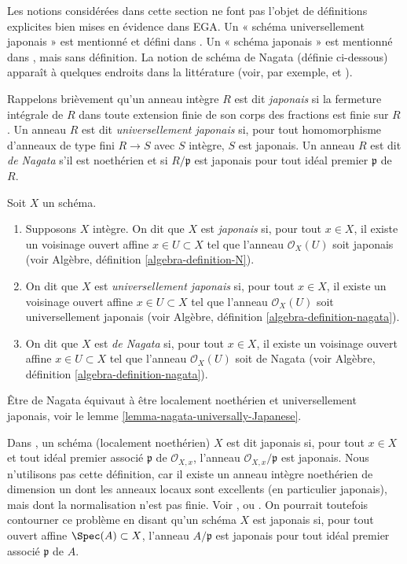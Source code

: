 \noindent
Les notions considérées dans cette section ne font pas l'objet de définitions explicites bien mises en évidence dans EGA.
Un « schéma universellement japonais » est mentionné et défini dans
\cite[IV Corollary 5.11.4]{EGA}. Un « schéma japonais » est mentionné dans
\cite[IV Remark 10.4.14 (ii)]{EGA}, mais sans définition.
La notion de schéma de Nagata (définie ci-dessous) apparaît à quelques
endroits dans la littérature (voir, par exemple, \cite[Definition 8.2.30]{Liu} et
\cite[Page 142]{Greco}).

\medskip\noindent
Rappelons brièvement qu'un anneau intègre $R$ est dit {\it japonais} si la fermeture
intégrale de $R$ dans toute extension finie de son corps des fractions est finie sur
$R$. Un anneau $R$ est dit {\it universellement japonais} si, pour tout homomorphisme
d'anneaux de type fini $R \to S$ avec $S$ intègre, $S$ est japonais. Un anneau $R$ est dit
{\it de Nagata} s'il est noethérien et si $R/\mathfrak p$ est japonais pour tout
idéal premier $\mathfrak p$ de $R$.

\begin{definition}
\label{definition-nagata}
Soit $X$ un schéma.
\begin{enumerate}
\item Supposons $X$ intègre. On dit que $X$ est {\it japonais}
si, pour tout $x \in X$, il existe un
voisinage ouvert affine $x \in U \subset X$ tel que l'anneau
$\mathcal{O}_X(U)$ soit japonais (voir
Algèbre, définition \ref{algebra-definition-N}).
\item On dit que $X$ est {\it universellement japonais} si, pour tout $x \in X$,
il existe un voisinage ouvert affine $x \in U \subset X$ tel que
l'anneau $\mathcal{O}_X(U)$ soit universellement japonais (voir
Algèbre, définition \ref{algebra-definition-nagata}).
\item On dit que $X$ est {\it de Nagata} si, pour tout $x \in X$, il existe un
voisinage ouvert affine $x \in U \subset X$ tel que l'anneau
$\mathcal{O}_X(U)$ soit de Nagata (voir
Algèbre, définition \ref{algebra-definition-nagata}).
\end{enumerate}
\end{definition}

\noindent
Être de Nagata équivaut à être localement noethérien
et universellement japonais, voir le
lemme \ref{lemma-nagata-universally-Japanese}.

\begin{remark}
\label{remark-non-integral-Japanese}
Dans \cite{Hoobler-finite}, un schéma (localement noethérien) $X$ est dit
japonais si, pour tout $x \in X$ et tout idéal premier associé $\mathfrak p$
de $\mathcal{O}_{X, x}$, l'anneau $\mathcal{O}_{X, x}/\mathfrak p$ est
japonais. Nous n'utilisons pas cette définition, car il existe un anneau
intègre noethérien de dimension un dont les anneaux locaux sont excellents (en particulier
japonais), mais dont la normalisation n'est pas finie. Voir
\cite[Example 1]{Hochster-loci}, \cite{Heinzer-Levy} ou
\cite[Expos\'e XIX]{Traveaux}.
On pourrait toutefois contourner ce problème en disant qu'un schéma
$X$ est japonais si, pour tout ouvert affine $\Spec(A) \subset X$, l'anneau
$A/\mathfrak p$ est japonais pour tout idéal premier associé $\mathfrak p$ de $A$.
\end{remark}

